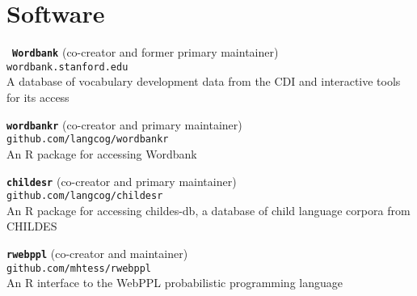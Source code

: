 \documentclass[11pt,]{article}
\begin{document}
\hypertarget{software}{%
\section{Software}\label{software}}

~\textbf{\texttt{Wordbank}} (co-creator and former primary maintainer)\\
\hspace*{0.333em}\hspace*{0.333em}\hspace*{0.333em}\hspace*{0.333em}\texttt{wordbank.stanford.edu}\\
\hspace*{0.333em}\hspace*{0.333em}\hspace*{0.333em}\hspace*{0.333em}A
database of vocabulary development data from the CDI and interactive
tools for its access

\textbf{\texttt{wordbankr}} (co-creator and primary maintainer)\\
\hspace*{0.333em}\hspace*{0.333em}\hspace*{0.333em}\hspace*{0.333em}\texttt{github.com/langcog/wordbankr}\\
\hspace*{0.333em}\hspace*{0.333em}\hspace*{0.333em}\hspace*{0.333em}An R
package for accessing Wordbank

\textbf{\texttt{childesr}} (co-creator and primary maintainer)\\
\hspace*{0.333em}\hspace*{0.333em}\hspace*{0.333em}\hspace*{0.333em}\texttt{github.com/langcog/childesr}\\
\hspace*{0.333em}\hspace*{0.333em}\hspace*{0.333em}\hspace*{0.333em}An R
package for accessing childes-db, a database of child language corpora
from CHILDES

\textbf{\texttt{rwebppl}} (co-creator and maintainer)\\
\hspace*{0.333em}\hspace*{0.333em}\hspace*{0.333em}\hspace*{0.333em}\texttt{github.com/mhtess/rwebppl}\\
\hspace*{0.333em}\hspace*{0.333em}\hspace*{0.333em}\hspace*{0.333em}An R
interface to the WebPPL probabilistic programming language
\end{document}

